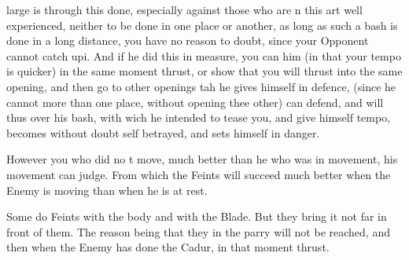 \newpage


\newpage


large is through this done, especially against those who are n this
art well experienced, neither to be done in one place or another, as
long as such a bash is done in a long distance, you have no reason to
doubt, since your Opponent cannot catch upi. And if he did this in
measure, you can him (in that your tempo is quicker) in the same
moment thrust, or show that you will thrust into the same opening, and
then go to other openings tah he gives himself in defence, (since he
cannot more than one place, without opening thee other) can defend, and
will thus over his bash, with wich he intended to tease you, and give
himself tempo, becomes without doubt self betrayed, and sets himself
in danger.


However you who did no t move, much better than he who was in
movement, his movement can judge. From which the Feints will succeed
much better when the Enemy is moving than when he is at rest.


Some do Feints with the body and with the Blade. But they bring it not
far in front of them. The reason being that they in the parry will not
be reached, and then when the Enemy has done the Cadur, in that moment
thrust.

